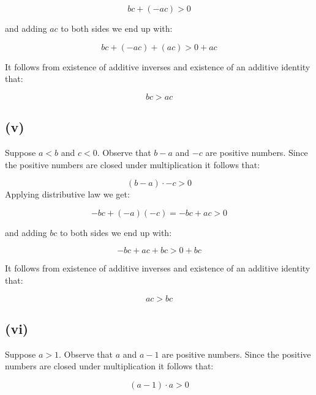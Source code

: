 \documentclass{article}
\begin{document}
\begin{equation*}
	bc + (-ac) > 0
\end{equation*}

and adding \(ac\) to both sides we end up with:

\begin{equation*}
	bc + (-ac) + (ac) > 0 + ac 
\end{equation*}

It follows from existence of additive inverses and existence of an additive identity that:

\begin{equation*}
	bc > ac
\end{equation*}

\subsection*{(v)}

Suppose \(a < b\) and \(c < 0\). Observe that \(b - a\) and \(-c\) are positive numbers.
Since the positive numbers are closed under multiplication it follows that:

\begin{equation*}
	(b-a) \cdot -c > 0
\end{equation*}
Applying distributive law we get:

\begin{equation*}
	-bc + (-a)(-c) = -bc + ac > 0
\end{equation*}

and adding \(bc\) to both sides we end up with:

\begin{equation*}
	-bc + ac + bc > 0 + bc
\end{equation*}

It follows from existence of additive inverses and existence of an additive identity that:

\begin{equation*}
	ac > bc
\end{equation*}

\subsection*{(vi)}

Suppose \(a > 1\). Observe that \(a\) and \(a - 1\) are positive numbers.
Since the positive numbers are closed under multiplication it follows that:

\begin{equation*}
	(a -1) \cdot a > 0
\end{equation*}
\end{document}

